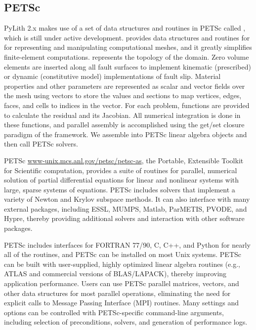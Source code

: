 \subsection{PETSc}

PyLith 2.x makes use of a set of data structures and routines in PETSc
called , which is still under active
development.  provides data structures and routines for
for representing and manipulating computational meshes, and it greatly
simplifies finite-element computations. represents the
topology of the domain. Zero volume elements are inserted along all
fault surfaces to implement kinematic (prescribed) or dynamic
(constitutive model) implementations of fault slip. Material
properties and other parameters are represented as scalar and vector
fields over the mesh using vectors to store the values and sections to
map vertices, edges, faces, and cells to indices in the vector. For
each problem, functions are provided to calculate the residual and its
Jacobian.  All numerical integration is done in these functions, and
parallel assembly is accomplished using the get/set closure paradigm
of the  framework. We assemble into PETSc linear
algebra objects and then call PETSc solvers.

PETSc \url{www-unix.mcs.anl.gov/petsc/petsc-as}, the Portable,
Extensible Toolkit for Scientific computation, provides a suite of
routines for parallel, numerical solution of partial differential
equations for linear and nonlinear systems with large, sparse systems
of equations.  PETSc includes solvers that implement a variety of
Newton and Krylov subspace methods. It can also interface with many
external packages, including ESSL, MUMPS, Matlab, ParMETIS, PVODE, and
Hypre, thereby providing additional solvers and interaction with other
software packages.

PETSc includes interfaces for FORTRAN 77/90, C, C++, and Python for
nearly all of the routines, and PETSc can be installed on most Unix
systems. PETSc can be built with user-supplied, highly optimized
linear algebra routines (e.g., ATLAS and commercial versions of
BLAS/LAPACK), thereby improving application performance. Users can use
PETSc parallel matrices, vectors, and other data structures for most
parallel operations, eliminating the need for explicit calls to
Message Passing Interface (MPI) routines. Many settings and options
can be controlled with PETSc-specific command-line arguments,
including selection of preconditions, solvers, and generation of
performance logs.
